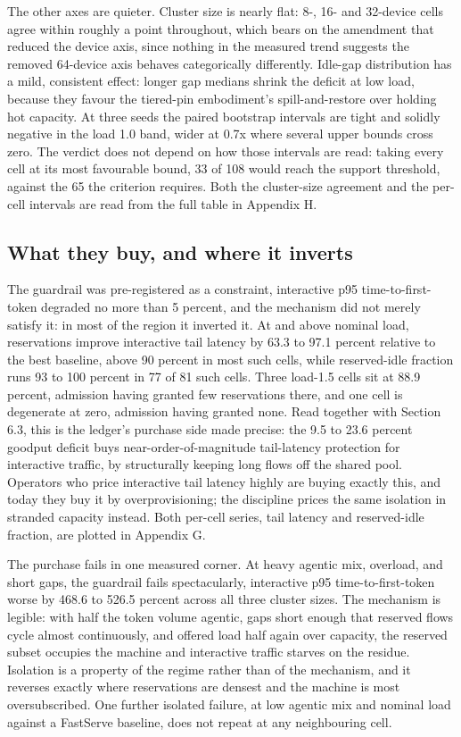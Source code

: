 The other axes are quieter. Cluster size is nearly flat: 8-, 16- and
32-device cells agree within roughly a point throughout, which bears on
the amendment that reduced the device axis, since nothing in the
measured trend suggests the removed 64-device axis behaves categorically
differently. Idle-gap distribution has a mild, consistent effect: longer
gap medians shrink the deficit at low load, because they favour the
tiered-pin embodiment's spill-and-restore over holding hot capacity. At
three seeds the paired bootstrap intervals are tight and solidly
negative in the load 1.0 band, wider at 0.7x where several upper bounds
cross zero. The verdict does not depend on how those intervals are read:
taking every cell at its most favourable bound, 33 of 108 would reach
the support threshold, against the 65 the criterion requires. Both the
cluster-size agreement and the per-cell intervals are read from the full
table in Appendix H.

\subsection{What they buy, and where it inverts}

The guardrail was pre-registered as a constraint, interactive p95
time-to-first-token degraded no more than 5 percent, and the mechanism
did not merely satisfy it: in most of the region it inverted it. At and
above nominal load, reservations improve interactive tail latency by
63.3 to 97.1 percent relative to the best baseline, above 90 percent in
most such cells, while reserved-idle fraction runs 93 to 100 percent in
77 of 81 such cells. Three load-1.5 cells sit at 88.9 percent, admission
having granted few reservations there, and one cell is degenerate at
zero, admission having granted none. Read together with Section 6.3,
this is the ledger's purchase side made precise: the 9.5 to 23.6 percent
goodput deficit buys near-order-of-magnitude tail-latency protection for
interactive traffic, by structurally keeping long flows off the shared
pool. Operators who price interactive tail latency highly are buying
exactly this, and today they buy it by overprovisioning; the discipline
prices the same isolation in stranded capacity instead. Both per-cell
series, tail latency and reserved-idle fraction, are plotted in Appendix
G.

The purchase fails in one measured corner. At heavy agentic mix,
overload, and short gaps, the guardrail fails spectacularly, interactive
p95 time-to-first-token worse by 468.6 to 526.5 percent across all three
cluster sizes. The mechanism is legible: with half the token volume
agentic, gaps short enough that reserved flows cycle almost
continuously, and offered load half again over capacity, the reserved
subset occupies the machine and interactive traffic starves on the
residue. Isolation is a property of the regime rather than of the
mechanism, and it reverses exactly where reservations are densest and
the machine is most oversubscribed. One further isolated failure, at low
agentic mix and nominal load against a FastServe baseline, does not
repeat at any neighbouring cell.

